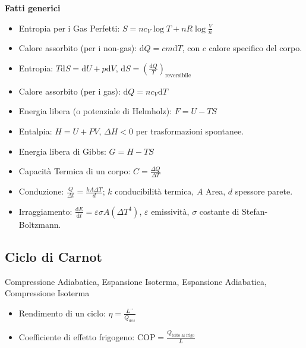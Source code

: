 \documentclass[10pt,a4paper]{article}
\newcommand{\de}{{\ensuremath{ \mbox{d}}}}
\newcommand{\Lusc}{{\ensuremath{L^{\vec{}}}}}
\begin{document}
\begin{multicols}{2}
  {\bf Fatti generici}
  \begin{itemize}
  \item Entropia per i Gas Perfetti: $S = nc_V \log T + nR \log \frac{V}{n}$
  \item Calore assorbito (per i non-gas): $\mbox{d}Q = c m \mbox{d}T$, con $c$ calore specifico del corpo.
  \item Entropia: $T \mbox{d}S = \mbox{d}U + p \mbox{d}V$, $\mbox{d}S = \left(\frac{\mbox{d}Q}{T}\right)_{\mbox{reversibile}}$
  \item Calore assorbito (per i gas): $\mbox{d}Q = n c_V \mbox{d}T$
  \item Energia libera (o potenziale di Helmholz): $F = U - TS$
  \item Entalpia: $H = U + PV$, $\Delta H < 0$ per trasformazioni spontanee.
  \item Energia libera di Gibbs: $G = H - TS$
  \end{itemize}

  \begin{itemize}
  \item Capacità Termica di un corpo: $C = \frac{\Delta Q}{\Delta T}$
  \item Conduzione: $\frac{Q}{\Delta t} = \frac{k A \Delta T}{d}$; $k$ conducibilit\`a termica, $A$ Area, $d$ spessore parete.
  \item Irraggiamento: $\frac{\de E}{\de t} = \varepsilon \sigma A (\Delta T^4)$, $\varepsilon$ emissivit\`a, $\sigma$ costante di Stefan-Boltzmann.
  \end{itemize}

  \subsection*{Ciclo di Carnot}
  Compressione Adiabatica, Espansione Isoterma, Espansione Adiabatica, Compressione Isoterma
  
  \begin{itemize}
  \item Rendimento di un ciclo: $\eta = \frac{\Lusc}{Q_{ass}}$
  \item Coefficiente di effetto frigogeno: $\mbox{COP} = \frac{Q_{\mbox{tolto al frigo}}}{L}$
  \end{itemize}


\end{multicols}
\end{document}
